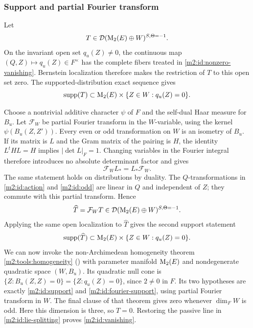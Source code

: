 \subsubsection{Support and partial Fourier transform}

Let
\[
 T\in\mathcal D(\operatorname{M}_2(E)\oplus W)^{S,\Theta=-1}.
\]
On the invariant open set $q_u(Z)\ne0$, the continuous map
$(Q,Z)\mapsto q_u(Z)\in F^\times$ has the complete fibers
treated in \eqref{m2:id:nonzero-vanishing}. Bernstein localization
therefore makes the restriction of $T$ to this open set zero.
The supported-distribution exact sequence gives
\begin{equation}\label{m2:id:support}
 \operatorname{supp}(T)\subset\operatorname{M}_2(E)\times\{Z\in W:q_u(Z)=0\}.
\end{equation}

Choose a nontrivial additive character $\psi$ of $F$ and the
self-dual Haar measure for $B_u$. Let $\mathcal F_W$ be partial
Fourier transform in the $W$-variable, using the kernel
$\psi(B_u(Z,Z'))$. Every even or odd transformation on $W$ is an
isometry of $B_u$. If its matrix is $L$ and the Gram matrix of the
pairing is $H$, the identity $L^tHL=H$ implies
$|\det L|_F=1$. Changing variables in the Fourier integral
therefore introduces no absolute determinant factor and gives
\[
 \mathcal F_W L_*=L_*\mathcal F_W.
\]
The same statement holds on distributions by duality. The
$Q$-transformations in \eqref{m2:id:action} and \eqref{m2:id:odd} are
linear in $Q$ and independent of $Z$; they commute with this partial
transform. Hence
\[
 \widehat T=\mathcal F_WT
       \in\mathcal D(\operatorname{M}_2(E)\oplus W)^{S,\Theta=-1}.
\]
Applying the same open localization to $\widehat T$ gives the
second support statement
\begin{equation}\label{m2:id:fourier-support}
 \operatorname{supp}(\widehat T)\subset
              \operatorname{M}_2(E)\times\{Z\in W:q_u(Z)=0\}.
\end{equation}
We can now invoke the non-Archimedean homogeneity theorem
\cref{m2:tools:homogeneity} (\cite[Theorem~5.1.5]{AGDescent})
with parameter manifold $\operatorname{M}_2(E)$ and nondegenerate quadratic
space $(W,B_u)$. Its quadratic null cone is
$\{Z:B_u(Z,Z)=0\}=\{Z:q_u(Z)=0\}$, since $2\ne0$ in $F$.
Its two hypotheses are exactly
\eqref{m2:id:support} and \eqref{m2:id:fourier-support}, using partial
Fourier transform in $W$. The final clause of that theorem gives
zero whenever $\dim_F W$ is odd. Here this dimension is three, so
$T=0$. Restoring the passive line in \eqref{m2:id:lie-splitting}
proves \cref{m2:id:vanishing}.

